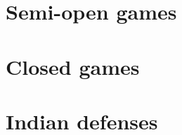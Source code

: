 \documentclass[a4paper]{extarticle}
\begin{document}
\section{Semi-open games}

\section{Closed games}

\section{Indian defenses}
\end{document}
